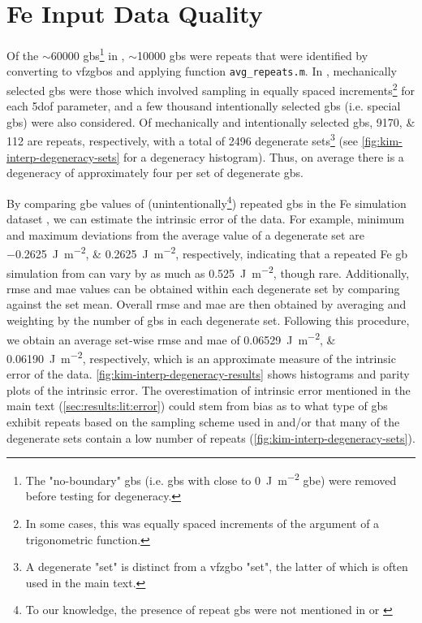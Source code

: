\documentclass[preprint,12pt]{elsarticle}
\begin{document}
\section{Fe Input Data Quality}
	\label{sec:supp:kim-interp:quality}
	Of the $\sim$\num{60000} \glspl{gb}\footnote{The "no-boundary" \glspl{gb} (i.e. \glspl{gb} with close to \SI{0}{\joule\per\square\meter} \gls{gbe}) were removed before testing for degeneracy.} in \cite{kimPhasefieldModeling3D2014}, $\sim$\num{10000} \glspl{gb} were repeats that were identified by converting to \glspl{vfzgbo} and applying \vfzorepo{} function \texttt{avg\_repeats.m}. In \cite{kimPhasefieldModeling3D2014}, mechanically selected \glspl{gb} were those which involved sampling in equally spaced increments\footnote{In some cases, this was equally spaced increments of the argument of a trigonometric function.} for each \gls{5dof} parameter, and a few thousand intentionally selected \glspl{gb} (i.e. special \glspl{gb}) were also considered. Of mechanically and intentionally selected \glspl{gb}, \numlist{9170;112} are repeats, respectively, with a total of \num{2496} degenerate sets\footnote{A degenerate "set" is distinct from a \gls{vfzgbo} "set", the latter of which is often used in the main text.} (see \cref{fig:kim-interp-degeneracy-sets} for a degeneracy histogram). Thus, on average there is a degeneracy of approximately four per set of degenerate \glspl{gb}.
	
	By comparing \gls{gbe} values of (unintentionally\footnote{To our knowledge, the presence of repeat \glspl{gb} were not mentioned in \cite{kimPhasefieldModeling3D2014} or \cite{kimIdentificationSchemeGrain2011}}) repeated \glspl{gb} in the Fe simulation dataset \cite{kimPhasefieldModeling3D2014}, we can estimate the intrinsic error of the \inpt{} data. For example, minimum and maximum deviations from the average value of a degenerate set are \SIlist{-0.2625;0.2625}{\joule\per\square\meter}, respectively, indicating that a repeated Fe \gls{gb} simulation from \cite{kimPhasefieldModeling3D2014} can vary by as much as \SI{0.525}{\joule\per\square\meter}, though rare. Additionally, \Gls{rmse} and \gls{mae} values can be obtained within each degenerate set by comparing against the set mean. Overall \gls{rmse} and \gls{mae} are then obtained by averaging and weighting by the number of \glspl{gb} in each degenerate set. Following this procedure, we obtain an average set-wise \gls{rmse} and \gls{mae} of \SIlist{0.06529;0.06190}{\joule\per\square\meter}, respectively, which is an approximate measure of the intrinsic error of the data. \cref{fig:kim-interp-degeneracy-results} shows histograms and parity plots of the intrinsic error. The overestimation of intrinsic error mentioned in the main text (\cref{sec:results:lit:error}) could stem from bias as to what type of \glspl{gb} exhibit repeats based on the sampling scheme used in \cite{kimPhasefieldModeling3D2014} and/or that many of the degenerate sets contain a low number of repeats (\cref{fig:kim-interp-degeneracy-sets}).
	
\end{document}
